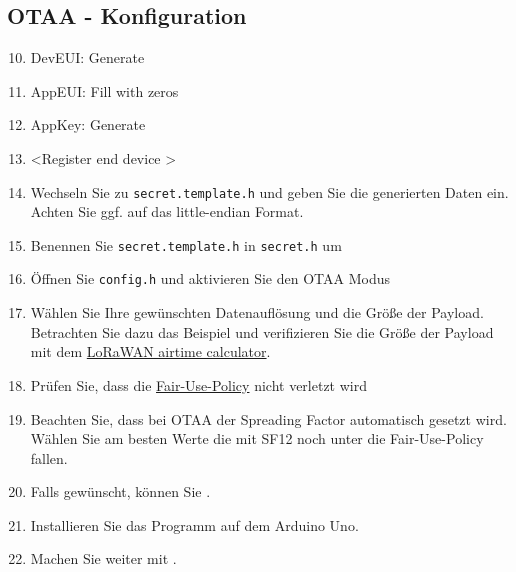 \documentclass[12pt]{article}
\begin{document}
    \subsection{OTAA - Konfiguration}
      \begin{enumerate}
        \setcounter{enumi}{9}
        \item DevEUI: Generate
        \item AppEUI: Fill with zeros
        \item AppKey: Generate
        \item \textless Register end device \textgreater{}
        \item Wechseln Sie zu \texttt{secret.template.h} und geben Sie die generierten Daten ein.
          Achten Sie ggf. auf das little-endian Format.
        \item Benennen Sie \texttt{secret.template.h} in \texttt{secret.h} um
        \item Öffnen Sie \texttt{config.h} und aktivieren Sie den OTAA Modus
        \item Wählen Sie Ihre gewünschten Datenauflösung und die Größe der Payload.
          Betrachten Sie dazu das Beispiel und verifizieren Sie die Größe der Payload mit dem
          \href{https://www.thethingsnetwork.org/airtime-calculator}{LoRaWAN airtime calculator}.
        \item Prüfen Sie, dass die \href{https://www.thethingsnetwork.org/docs/lorawan/duty-cycle/}{Fair-Use-Policy} nicht verletzt wird
        \item Beachten Sie, dass bei OTAA der Spreading Factor automatisch gesetzt wird.
          Wählen Sie am besten Werte die mit SF12 noch unter die Fair-Use-Policy fallen.
        \item Falls gewünscht, können Sie \underline{}.
        \item Installieren Sie das Programm auf dem Arduino Uno.
        \item Machen Sie weiter mit \underline{}.
      \end{enumerate}
\end{document}
